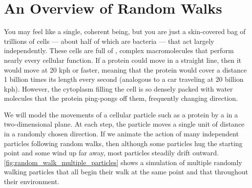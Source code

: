 \FloatBarrier
{}

\section{An Overview of Random Walks}
\label{sec:an_overview_of_random_walks}

You may feel like a single, coherent being, but you are just a skin-covered bag of trillions of cells --- about half of which are bacteria --- that act largely independently. These cells are full of , complex macromolecules that perform nearly every cellular function. If a protein could move in a straight line, then it would move at 20 kph or faster, meaning that the protein would cover a distance 1 billion times its length every second (analogous to a car traveling at 20 billion kph). However, the cytoplasm filling the cell is so densely packed with water molecules that the protein ping-pongs off them, frequently changing direction.

We will model the movements of a cellular particle such as a protein by a  in a two-dimensional plane. At each step, the particle moves a single unit of distance in a randomly chosen direction. If we animate the action of many independent particles following random walks, then although some particles hug the starting point and some wind up far away, most particles steadily drift outward. \autoref{fig:random_walk_multiple_particles} shows a simulation of multiple randomly walking particles that all begin their walk at the same point and that  throughout their environment.
\\

